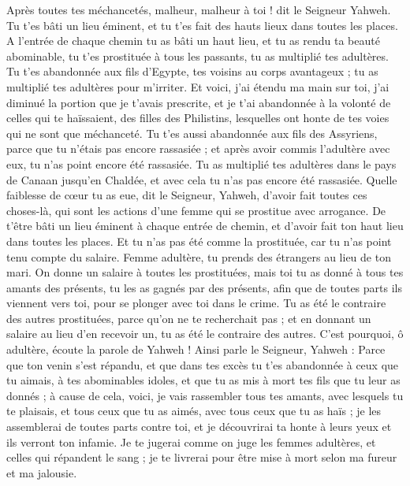\begin{multicols}{2}
Après toutes tes méchancetés, malheur, malheur à toi ! dit le Seigneur Yahweh.
Tu t'es bâti un lieu éminent, et tu t'es fait des hauts lieux dans toutes les places.
A l’entrée de chaque chemin tu as bâti un haut lieu, et tu as rendu ta beauté abominable, tu t'es prostituée à tous les passants, tu as multiplié tes adultères.
Tu t'es abandonnée aux fils d'Egypte, tes voisins au corps avantageux ; tu as multiplié tes adultères pour m'irriter.
Et voici, j'ai étendu ma main sur toi, j'ai diminué la portion que je t’avais prescrite, et je t'ai abandonnée à la volonté de celles qui te haïssaient, des filles des Philistins, lesquelles ont honte de tes voies qui ne sont que méchanceté.
Tu t'es aussi abandonnée aux fils des Assyriens\FTNT{}, parce que tu n'étais pas encore rassasiée ; et après avoir commis l’adultère avec eux, tu n'as point encore été rassasiée.
Tu as multiplié tes adultères dans le pays de Canaan jusqu’en Chaldée, et avec cela tu n'as pas encore été rassasiée.
Quelle faiblesse de cœur tu as eue, dit le Seigneur, Yahweh, d'avoir fait toutes ces choses-là, qui sont les actions d'une femme qui se prostitue avec arrogance.
De t'être bâti un lieu éminent à chaque entrée de chemin, et d'avoir fait ton haut lieu dans toutes les places. Et tu n’as pas été comme la prostituée, car tu n'as point tenu compte du salaire.
Femme adultère, tu prends des étrangers au lieu de ton mari.
On donne un salaire à toutes les prostituées, mais toi tu as donné à tous tes amants des présents\FTNT{}, tu les as gagnés par des présents, afin que de toutes parts ils viennent vers toi, pour se plonger avec toi dans le crime.
Tu as été le contraire des autres prostituées, parce qu’on ne te recherchait pas ; et en donnant un salaire au lieu d’en recevoir un, tu as été le contraire des autres.
C'est pourquoi, ô adultère, écoute la parole de Yahweh !
Ainsi parle le Seigneur, Yahweh : Parce que ton venin s'est répandu, et que dans tes excès tu t'es abandonnée à ceux que tu aimais, à tes abominables idoles, et que tu as mis à mort tes fils que tu leur as donnés ;
à cause de cela, voici, je vais rassembler tous tes amants, avec lesquels tu te plaisais, et tous ceux que tu as aimés, avec tous ceux que tu as haïs ; je les assemblerai de toutes parts contre toi, et je découvrirai ta honte à leurs yeux et ils verront ton infamie.
Je te jugerai comme on juge les femmes adultères, et celles qui répandent le sang\FTNT{} ; je te livrerai pour être mise à mort selon ma fureur et ma jalousie.

\end{multicols}
